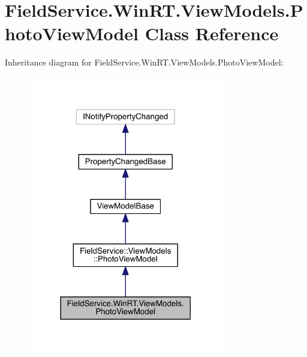 \hypertarget{class_field_service_1_1_win_r_t_1_1_view_models_1_1_photo_view_model}{\section{Field\+Service.\+Win\+R\+T.\+View\+Models.\+Photo\+View\+Model Class Reference}
\label{class_field_service_1_1_win_r_t_1_1_view_models_1_1_photo_view_model}
}


Inheritance diagram for Field\+Service.\+Win\+R\+T.\+View\+Models.\+Photo\+View\+Model\+:
\nopagebreak
\begin{figure}[H]
\begin{center}
\leavevmode
\includegraphics[width=242pt]{class_field_service_1_1_win_r_t_1_1_view_models_1_1_photo_view_model__inherit__graph}
\end{center}
\end{figure}



